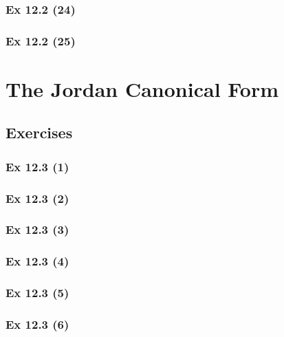 \subsubsection{Ex 12.2 (24)}\label{sec:Ex_12.2.24}

\subsubsection{Ex 12.2 (25)}\label{sec:Ex_12.2.25}

\newpage		%

\section{The Jordan Canonical Form}\label{sec:12.3}	
\subsection*{Exercises}\label{sec:12.3_Exercises}

\subsubsection{Ex 12.3 (1)}\label{sec:Ex_12.3.1}

\subsubsection{Ex 12.3 (2)}\label{sec:Ex_12.3.2}

\subsubsection{Ex 12.3 (3)}\label{sec:Ex_12.3.3}

\subsubsection{Ex 12.3 (4)}\label{sec:Ex_12.3.4}

\subsubsection{Ex 12.3 (5)}\label{sec:Ex_12.3.5}

\subsubsection{Ex 12.3 (6)}\label{sec:Ex_12.3.6}

